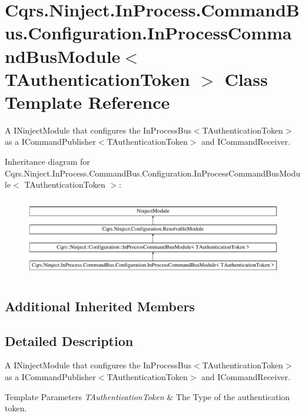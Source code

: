 \hypertarget{classCqrs_1_1Ninject_1_1InProcess_1_1CommandBus_1_1Configuration_1_1InProcessCommandBusModule}{}\section{Cqrs.\+Ninject.\+In\+Process.\+Command\+Bus.\+Configuration.\+In\+Process\+Command\+Bus\+Module$<$ T\+Authentication\+Token $>$ Class Template Reference}
\label{classCqrs_1_1Ninject_1_1InProcess_1_1CommandBus_1_1Configuration_1_1InProcessCommandBusModule}


A I\+Ninject\+Module that configures the In\+Process\+Bus$<$\+T\+Authentication\+Token$>$ as a I\+Command\+Publisher$<$\+T\+Authentication\+Token$>$ and I\+Command\+Receiver.  


Inheritance diagram for Cqrs.\+Ninject.\+In\+Process.\+Command\+Bus.\+Configuration.\+In\+Process\+Command\+Bus\+Module$<$ T\+Authentication\+Token $>$\+:\begin{figure}[H]
\begin{center}
\leavevmode
\includegraphics[height=3.544304cm]{classCqrs_1_1Ninject_1_1InProcess_1_1CommandBus_1_1Configuration_1_1InProcessCommandBusModule}
\end{center}
\end{figure}
\subsection*{Additional Inherited Members}


\subsection{Detailed Description}
A I\+Ninject\+Module that configures the In\+Process\+Bus$<$\+T\+Authentication\+Token$>$ as a I\+Command\+Publisher$<$\+T\+Authentication\+Token$>$ and I\+Command\+Receiver. 


\begin{DoxyTemplParams}{Template Parameters}
{\em T\+Authentication\+Token} & The Type of the authentication token.\\
\hline
\end{DoxyTemplParams}
